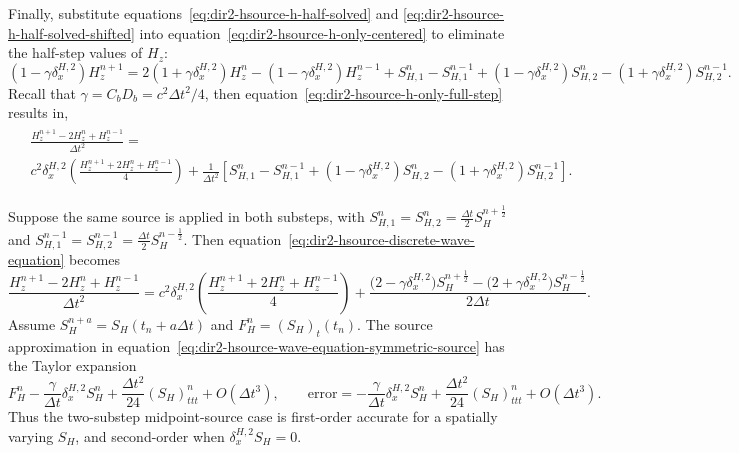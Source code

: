 \documentclass{article}
\numberwithin{figure}{section}
\begin{document}
Finally, substitute equations~\eqref{eq:dir2-hsource-h-half-solved} and \eqref{eq:dir2-hsource-h-half-solved-shifted} into equation~\eqref{eq:dir2-hsource-h-only-centered} to eliminate the half-step values of $H_z$:
\begin{equation}
    \left(1-\gamma\delta_x^{H,2}\right)H_z^{n+1}=2\left(1+\gamma\delta_x^{H,2}\right)H_z^n-\left(1-\gamma\delta_x^{H,2}\right)H_z^{n-1}+S_{H,1}^n-S_{H,1}^{n-1}+\left(1-\gamma\delta_x^{H,2}\right)S_{H,2}^n-\left(1+\gamma\delta_x^{H,2}\right)S_{H,2}^{n-1}. \label{eq:dir2-hsource-h-only-full-step}
\end{equation}
Recall that $\gamma=C_bD_b=c^2\Delta t^2/4$, then equation~\eqref{eq:dir2-hsource-h-only-full-step} results in,
\begin{align}
    \begin{split}
         & \frac{H_z^{n+1}-2H_z^n+H_z^{n-1}}{\Delta t^2}=                                                                                                                                                                                                                       \\
         & c^2\delta_x^{H,2}\left(\frac{H_z^{n+1}+2H_z^n+H_z^{n-1}}{4}\right)+\frac{1}{\Delta t^2}\left[S_{H,1}^n-S_{H,1}^{n-1}+\left(1-\gamma\delta_x^{H,2}\right)S_{H,2}^n-\left(1+\gamma\delta_x^{H,2}\right)S_{H,2}^{n-1}\right]. \label{eq:dir2-hsource-discrete-wave-equation}
    \end{split}
\end{align}

Suppose the same source is applied in both substeps, with $S_{H,1}^n=S_{H,2}^n=\frac{\Delta t}{2}S_H^{n+\frac{1}{2}}$ and $S_{H,1}^{n-1}=S_{H,2}^{n-1}=\frac{\Delta t}{2}S_H^{n-\frac{1}{2}}$. Then equation~\eqref{eq:dir2-hsource-discrete-wave-equation} becomes
\begin{equation}
    \frac{H_z^{n+1}-2H_z^n+H_z^{n-1}}{\Delta t^2}=c^2\delta_x^{H,2}\left(\frac{H_z^{n+1}+2H_z^n+H_z^{n-1}}{4}\right)+\frac{\bigl(2-\gamma\delta_x^{H,2}\bigr)S_H^{n+\frac{1}{2}}-\bigl(2+\gamma\delta_x^{H,2}\bigr)S_H^{n-\frac{1}{2}}}{2\Delta t}. \label{eq:dir2-hsource-wave-equation-symmetric-source}
\end{equation}
Assume $S_H^{n+a}=S_H(t_n+a\Delta t)$ and $F_H^n=(S_H)_t(t_n)$. The source approximation in equation~\eqref{eq:dir2-hsource-wave-equation-symmetric-source} has the Taylor expansion
\begin{equation}
    F_H^n-\frac{\gamma}{\Delta t}\delta_x^{H,2}S_H^n+\frac{\Delta t^2}{24}(S_H)_{ttt}^n+O(\Delta t^3), \qquad \mathrm{error}=-\frac{\gamma}{\Delta t}\delta_x^{H,2}S_H^n+\frac{\Delta t^2}{24}(S_H)_{ttt}^n+O(\Delta t^3). \label{eq:dir2-hsource-symmetric-source-error}
\end{equation}
Thus the two-substep midpoint-source case is first-order accurate for a spatially varying $S_H$, and second-order when $\delta_x^{H,2}S_H=0$.
\end{document}
